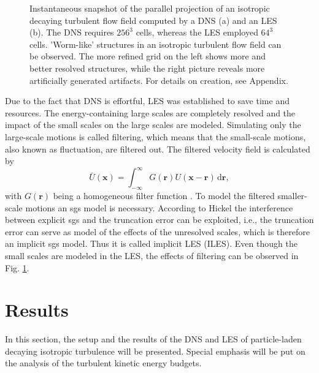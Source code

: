 \documentclass[11pt,a4paper,openany,oneside,parskip=half*]{article}
\renewcommand*\vec[1]{\boldsymbol{#1}}
\begin{document}
\begin{figure}[h]
\begin{minipage}[t]{0.5\textwidth}
        \label{64_velocity}
    \end{minipage}
    \captionsetup{width=0.97\linewidth}
\caption{Instantaneous snapshot of the parallel projection of an isotropic decaying turbulent flow field computed by a DNS (a) and an LES (b). The DNS requires $256^3$ cells, whereas the LES employed $64^3$ cells. 'Worm-like' structures in an isotropic turbulent flow field can be observed. The more refined grid on the left shows more and better resolved structures, while the right picture reveals more artificially generated artifacts. For details on creation, see Appendix.}
\label{comparisonLESDNS}
\end{figure}
Due to the fact that DNS is effortful, LES was established to save time and resources. The energy-containing large scales are completely resolved and the impact of the small scales on the large scales are modeled.
\newline
Simulating only the large-scale motions is called filtering, which means that the small-scale motions, also known as fluctuation, are filtered out. The filtered velocity field is calculated by 
\begin{equation}
\bar U(\vec{x}) = \int_{-\infty}^{\infty} G(\vec{r})U(\vec{x} - \vec{r})  \, \mathrm{d}\vec{r},
\end{equation}
with $G(\vec{r}) $ being a homogeneous filter function \cite{turbulentFlows}. To model the filtered smaller-scale motions an sgs model is necessary. According to Hickel \cite{implicitLES} the interference between explicit sgs and the truncation error can be exploited, i.e., the truncation error can serve as model of the effects of the unresolved scales, which is therefore an implicit sgs model. Thus it is called implicit LES (ILES).
\newline
Even though the small scales are modeled in the LES, the effects of filtering can be observed in Fig. \ref{comparisonLESDNS}.
\newline
\pagebreak
\section{Results}
In this section, the setup and the results of the DNS and LES of particle-laden decaying isotropic turbulence will be presented. Special emphasis will be put on the analysis of the turbulent kinetic energy budgets.
\newline
\end{document}
